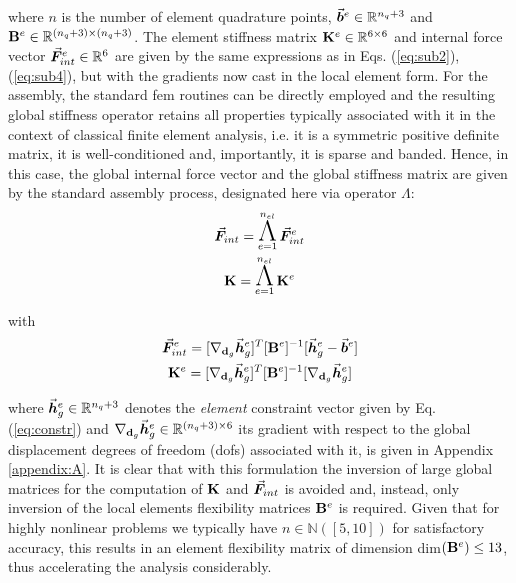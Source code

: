 \noindent where $n$ is the number of element quadrature points,
$\vec{\bm{b}}^e\in\mathbb{R}^{n_q+3}$ and 
$\mathbf{B}^e\in\mathbb{R}^{(n_q+3)\times 
(n_q+3)}$. 
The element stiffness matrix $\mathbf{K}^e\in\mathbb{R}^{6\times 6}$ and 
internal force vector $\vec{\bm{F}}_{int}^e\in\mathbb{R}^{6}$ are given by the same
expressions as in Eqs. (\ref{eq:sub2}), (\ref{eq:sub4}), but with the gradients
now cast in the local element form. For the assembly,
the standard \acrshort{fem} routines can be directly employed and the resulting 
global 
stiffness operator retains all properties typically associated with it in the 
context of classical finite element analysis, i.e. it is a symmetric positive 
definite matrix, it is well-conditioned and, importantly, it is sparse and
banded. Hence, in this case, the global internal force vector and the global 
stiffness matrix are given by the standard assembly process, designated here 
via operator {\large $\Lambda$}:
\begin{gather}
	\bvec{F}_{int} =\Assem_{e=1}^{n_{el}} \bvec{F}_{int}^e\label{eq:Fassemb}\\ 
	\bmat{K} = \Assem_{e=1}^{n_{el}} \bmat{K}^e
	\label{eq:assembly}
\end{gather}

with
\begin{gather}
	\vec{\bm{F}}_{int}^e =
	[\nabla_{\mathbf{d}_g}\vec{\bm{h}}_g^e]^T[\mathbf{B}^e]^{-1}[\vec{\bm{h}}_{g}^e-\vec{\bm{b}}^e]\label{eq:localforce}\\
	\mathbf{K}^e
	=[\nabla_{\mathbf{d}_g}\vec{\bm{h}}_g^e]^T[\mathbf{B}^e]^{-1}[\nabla_{\mathbf{d}_g}\vec{\bm{h}}_g^e]
	\label{eq:localstiff}
\end{gather}

\noindent where $\vec{\bm{h}}_g^e\in\mathbb{R}^{n_q+3}$ denotes 
the \textit{element} constraint vector given by Eq. (\ref{eq:constr}) and
$\nabla_{\mathbf{d}_g}\vec{\bm{h}}_g^e\in\mathbb{R}^{(n_q+3)\times 6}$ 
its
gradient with respect to the global displacement degrees of freedom 
(\acrshort{dof}s)
associated with it, is given in Appendix \ref{appendix:A}. It is clear that 
with this formulation the inversion of large global 
matrices for
the computation of $\mathbf{K}$ and $\vec{\bm{F}}_{int}$ is avoided and, instead, 
only 
inversion of the local elements flexibility matrices $\mathbf{B}^e$ is required.
Given that for highly nonlinear problems we typically 
have $n\in\mathbb{N}([5,10])$ for satisfactory accuracy, this
results in an element flexibility matrix of dimension dim$(\mathbf{B}^e)\leq 13$,
thus accelerating the analysis considerably. 

